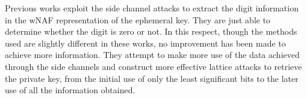 %



Previous works exploit the side channel attacks to extract the digit information in the wNAF representation of the ephemeral key.
They are just able to determine whether the digit is zero or not.
In this respect, though the methods used are slightly different in these works, no improvement has been made to achieve more information.
They attempt to make more use of the data achieved through the side channels and construct more effective lattice attacks to retrieve the private key,
 from the initial use of only the least significant bits to the later use of all the information obtained.

